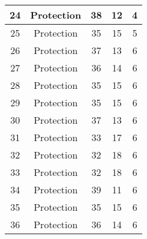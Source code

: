 \documentclass[results.tex]{subfiles}
\begin{document}
\begin{center}
\begin{tabular}{| c || c | c | c | c |}
            \hline
            24                      & Protection                   & 38                     & 12                      & 4                    \\
            \hline
            25                      & Protection                   & 35                     & 15                      & 5                    \\
            \hline
            26                      & Protection                   & 37                     & 13                      & 6                    \\
            \hline
            27                      & Protection                   & 36                     & 14                      & 6                    \\
            \hline
            28                      & Protection                   & 35                     & 15                      & 6                    \\
            \hline
            29                      & Protection                   & 35                     & 15                      & 6                    \\
            \hline
            30                      & Protection                   & 37                     & 13                      & 6                    \\
            \hline
            31                      & Protection                   & 33                     & 17                      & 6                    \\
            \hline
            32                      & Protection                   & 32                     & 18                      & 6                    \\
            \hline
            33                      & Protection                   & 32                     & 18                      & 6                    \\
            \hline
            34                      & Protection                   & 39                     & 11                      & 6                    \\
            \hline
            35                      & Protection                   & 35                     & 15                      & 6                    \\
            \hline
            36                      & Protection                   & 36                     & 14                      & 6                    \\

\end{tabular}
\end{center}
\end{document}
